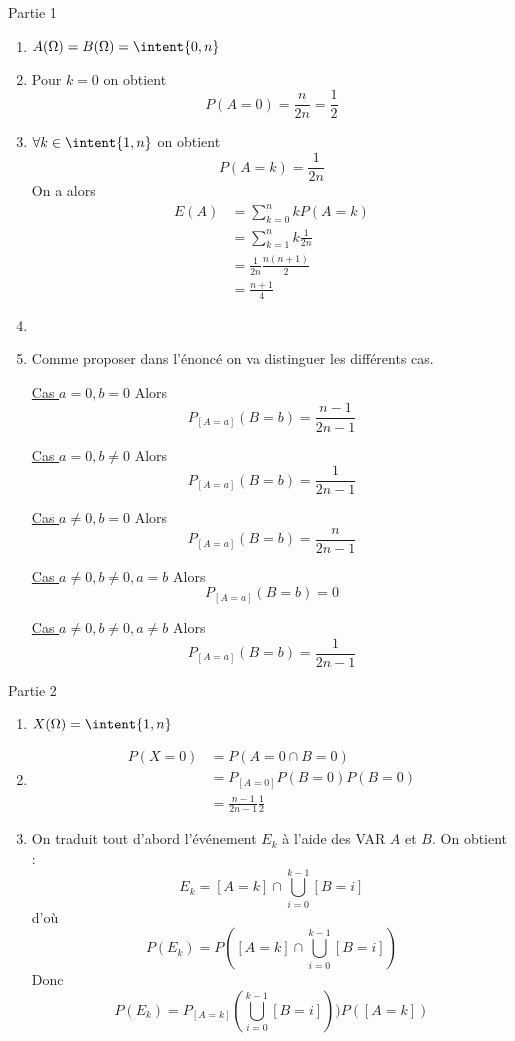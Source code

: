 \documentclass[a4paper, 11pt,reqno]{article}
\begin{document}
\begin{correction}
Partie 1 
\begin{enumerate}
\item $A(\Omega) = B(\Omega) = \intent{0,n}$
\item Pour $k=0$ on obtient 
$$P(A=0)  = \frac{n}{2n}= \frac{1}{2}$$

\item $\forall  k \in \intent{1,n}$ on obtient 
$$P(A=k) = \frac{1}{2n}$$
On a alors 
\begin{align*}
E(A) &=\sum_{k=0}^n k P(A=k)\\
		&=\sum_{k=1}^n k  \frac{1}{2n}\\
		&= \frac{1}{2n} \frac{n(n+1)}{2}\\
		&=\frac{n+1}{4}
\end{align*}

\item 

\item Comme proposer dans l'énoncé on va distinguer les différents cas. 

\underline{Cas $a= 0 , b=0$}
Alors  $$P_{[A=a]}(B=b) = \frac{n-1}{2n-1}$$

\underline{Cas $a= 0 , b\neq0$}
Alors  $$P_{[A=a]}(B=b) = \frac{1}{2n-1}$$

\underline{Cas $a\neq 0 , b=0$}
Alors  $$P_{[A=a]}(B=b) = \frac{n}{2n-1}$$

\underline{Cas $a\neq 0 , b\neq 0, a=b$}
Alors  $$P_{[A=a]}(B=b) = 0$$

\underline{Cas $a\neq 0 , b\neq 0, a\neq b$}
Alors  $$P_{[A=a]}(B=b) = \frac{1}{2n-1}$$


\end{enumerate}
Partie 2 
\begin{enumerate}
\item $X(\Omega)= \intent{1,n}$
\item \begin{align*}
P(X=0)& = P(A=0 \cap B=0)\\
		&= P_{[A=0]} P(B=0) P(B=0)\\
		&= \frac{n-1}{2n-1}\frac{1}{2}
\end{align*}

\item On traduit tout d'abord l'événement $E_k$ à l'aide des VAR $A$ et $B$. On obtient :
$$E_k = [A=k] \cap \bigcup_{i=0}^{k-1} [B=i]$$
d'où 
$$P(E_k) = P( [A=k] \cap \bigcup_{i=0}^{k-1} [B=i])$$
Donc 
$$P(E_k) = P_{[A=k] }( \bigcup_{i=0}^{k-1} [B=i]))  P([A=k] )$$


\end{enumerate}
\end{correction}
\end{document}
